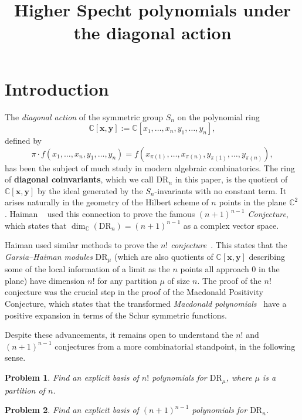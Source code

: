 \documentclass[ALCO,Unicode]{cedram}
\title[Higher Specht polynomials under the diagonal action]{Higher Specht polynomials under the diagonal action}
\author[\initial{M.} Gillespie]{\firstname{Maria} \lastname{Gillespie}}
\newtheorem{open}{Problem}
\newcommand{\DR}{\mathrm{DR}}
\newcommand{\CC}{\mathbb{C}}
\begin{document}
\maketitle

\section{Introduction}

\noindent The \textit{diagonal action} of the symmetric group $S_n$ on the polynomial ring $$\mathbb{C}[\mathbf{x},\mathbf{y}]:=\mathbb{C}[x_1,\ldots,x_n,y_1,\ldots,y_n],$$ defined by $$\pi\cdot  f(x_1,\ldots,x_n,y_1,\ldots,y_n)=f(x_{\pi(1)},\ldots,x_{\pi(n)},y_{\pi(1)},\ldots,y_{\pi(n)}),$$ has been the subject of much study in modern algebraic combinatorics.  The ring of \textbf{diagonal coinvariants}, which we call $\DR_n$ in this paper, is the quotient of $\mathbb{C}[\mathbf{x},\mathbf{y}]$ by the ideal generated by the $S_n$-invariants with no constant term.  It arises naturally in the geometry of the Hilbert scheme of $n$ points in the plane $\CC^2$.  Haiman ~\cite{HaimanDR} used this connection to prove the famous \textit{$(n+1)^{n-1}$ Conjecture}, which states that $\dim_\CC(\DR_n)=(n+1)^{n-1}$ as a complex vector space.  

Haiman used similar methods to prove the \textit{$n!$ conjecture}~\cite{HaimanGeometry}.  This states that the \textit{Garsia--Haiman modules} $\DR_\mu$ (which are also quotients of $\mathbb{C}[\mathbf{x},\mathbf{y}]$ describing some of the local information of a limit as the $n$ points all approach $0$ in the plane) have dimension $n!$ for any partition $\mu$ of size $n$.  The proof of the $n!$ conjecture was the crucial step in the proof of the Macdonald Positivity Conjecture, which states that the transformed \textit{Macdonald polynomials}~\cite{Macdonald} have a positive expansion in terms of the Schur symmetric functions.

Despite these advancements, it remains open to understand the $n!$ and $(n+1)^{n-1}$ conjectures from a more combinatorial standpoint, in the following sense.

\begin{open}\label{prob:nfact}
	Find an explicit basis of $n!$ polynomials for $\DR_\mu$, where $\mu$ is a partition of $n$.
\end{open}

\begin{open}\label{prob:basis-DR}
	Find an explicit basis of $(n+1)^{n-1}$ polynomials for $\DR_n$.
\end{open}
\end{document}
